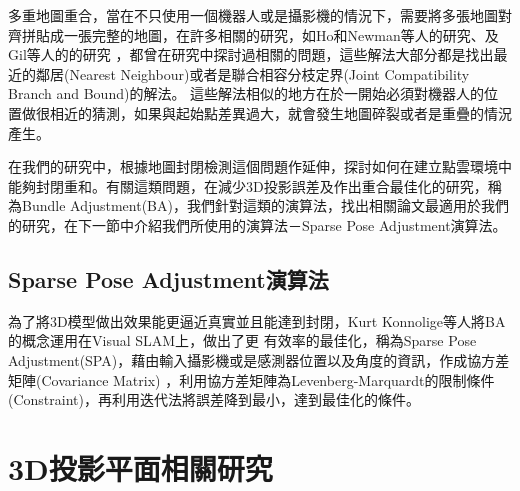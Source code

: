 	多重地圖重合，當在不只使用一個機器人或是攝影機的情況下，需要將多張地圖對齊拼貼成一張完整的地圖，在許多相關的研究，如Ho和Newman等人的研究\cite{Ho2007}、及Gil等人的的研究
\cite{Gil2010}，都曾在研究中探討過相關的問題，這些解法大部分都是找出最近的鄰居(Nearest Neighbour)或者是聯合相容分枝定界(Joint Compatibility Branch and Bound)的解法。
這些解法相似的地方在於一開始必須對機器人的位置做很相近的猜測，如果與起始點差異過大，就會發生地圖碎裂或者是重疊的情況產生。

	在我們的研究中，根據地圖封閉檢測這個問題作延伸，探討如何在建立點雲環境中能夠封閉重和。有關這類問題，在減少3D投影誤差及作出重合最佳化的研究，稱為Bundle 
Adjustment(BA)\cite{Triggs2000}，我們針對這類的演算法，找出相關論文最適用於我們的研究，在下一節中介紹我們所使用的演算法－Sparse Pose Adjustment演算法。

\subsection{Sparse Pose Adjustment演算法}
%
	為了將3D模型做出效果能更逼近真實並且能達到封閉，Kurt Konnolige等人將BA的概念運用在Visual SLAM上\cite{Konolige2010}，做出了更
有效率的最佳化，稱為Sparse Pose Adjustment(SPA)，藉由輸入攝影機或是感測器位置以及角度的資訊，作成協方差矩陣(Covariance Matrix)
，利用協方差矩陣為Levenberg-Marquardt的限制條件(Constraint)，再利用迭代法將誤差降到最小，達到最佳化的條件。


\section{3D投影平面相關研究}

	


